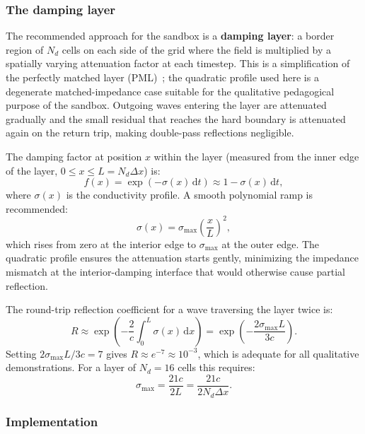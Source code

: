 \documentclass[11pt,a4paper]{article}
\newcommand{\dd}{\mathrm{d}}
\begin{document}
\subsubsection*{The damping layer}

The recommended approach for the sandbox is a \textbf{damping layer}: a border region of $N_d$ cells on each side of the grid where the field is multiplied by a spatially varying attenuation factor at each timestep.  This is a simplification of the perfectly matched layer (PML)~\cite{Berenger1994,TafloveHagness2005}; the quadratic profile used here is a degenerate matched-impedance case suitable for the qualitative pedagogical purpose of the sandbox.  Outgoing waves entering the layer are attenuated gradually and the small residual that reaches the hard boundary is attenuated again on the return trip, making double-pass reflections negligible.

The damping factor at position $x$ within the layer (measured from the inner edge of the layer, $0 \leq x \leq L = N_d\Delta x$) is:
\begin{equation}
  f(x) = \exp\!\left(-\sigma(x)\,\dd t\right) \approx 1 - \sigma(x)\,\dd t,
\end{equation}
where $\sigma(x)$ is the conductivity profile.  A smooth polynomial ramp is recommended:
\begin{equation}
\label{eq:damp_profile}
  \sigma(x) = \sigma_{\max}\!\left(\frac{x}{L}\right)^2,
\end{equation}
which rises from zero at the interior edge to $\sigma_{\max}$ at the outer edge.  The quadratic profile ensures the attenuation starts gently, minimizing the impedance mismatch at the interior-damping interface that would otherwise cause partial reflection.

The round-trip reflection coefficient for a wave traversing the layer twice is:
\begin{equation}
  R \approx \exp\!\left(-\frac{2}{c}\int_0^L \sigma(x)\,\dd x\right)
           = \exp\!\left(-\frac{2\sigma_{\max}L}{3c}\right).
\end{equation}
Setting $2\sigma_{\max}L/3c = 7$ gives $R \approx e^{-7} \approx 10^{-3}$, which is adequate for all qualitative demonstrations.  For a layer of $N_d = 16$ cells this requires:
\begin{equation}
  \sigma_{\max} = \frac{21c}{2L} = \frac{21c}{2 N_d \Delta x}.
\end{equation}

\subsubsection*{Implementation}
\end{document}
